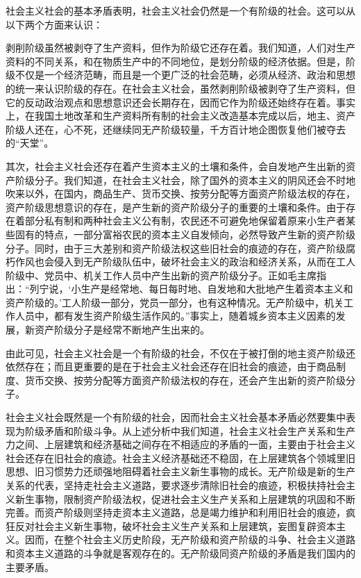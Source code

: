 \documentclass{book}
\begin{document}
社会主义社会的基本矛盾表明，社会主义社会仍然是一个有阶级的社会。这可以从以下两个方面来认识：

剥削阶级虽然被剥夺了生产资料，但作为阶级它还存在着。我们知道，人们对生产资料的不同关系，和在物质生产中的不同地位，是划分阶级的经济依据。但是，阶级不仅是一个经济范畴，而且是一个更广泛的社会范畴，必须从经济、政治和思想的统一来认识阶级的存在。在社会主义社会，虽然剥削阶级被剥夺了生产资料，但它的反动政治观点和思想意识还会长期存在，因而它作为阶级还始终存在着。事实上，在我国土地改革和生产资料所有制的社会主义改造基本完成以后，地主、资产阶级人还在，心不死，还继续同无产阶级较量，千方百计地企图恢复他们被夺去的“天堂”。

其次，社会主义社会还存在着产生资本主义的土壤和条件，会自发地产生出新的资产阶级分子。我们知道，在社会主义社会，除了国外的资本主义的阴风还会不时地吹来以外，在国内，商品生产、货币交换、按劳分配等方面资产阶级法权的存在，资产阶级思想意识的存在，是产生新的资产阶级分子的重要的土壤和条件。由于存在着部分私有制和两种社会主义公有制，农民还不可避免地保留着原来小生产者某些固有的特点，一部分富裕农民的资本主义自发倾向，必然导致产生新的资产阶级分子。同时，由于三大差别和资产阶级法权这些旧社会的痕迹的存在，资产阶级腐朽作风也会侵入到无产阶级队伍中，破坏社会主义的政治和经济关系，从而在工人阶级中、党员中、机关工作人员中产生出新的资产阶级分子。正如毛主席指出：“列宁说，‘小生产是经常地、每日每时地、自发地和大批地产生着资本主义和资产阶级的。’工人阶级一部分，党员一部分，也有这种情况。无产阶级中，机关工作人员中，都有发生资产阶级生活作风的。”事实上，随着城乡资本主义因素的发展，新资产阶级分子是经常不断地产生出来的。

由此可见，社会主义社会是一个有阶级的社会，不仅在于被打倒的地主资产阶级还依然存在；而且更重要的是在于社会主义社会还存在旧社会的痕迹，由于商品制度、货币交换、按劳分配等方面资产阶级法权的存在，还会产生出新的资产阶级分子。

社会主义社会既然是一个有阶级的社会，因而社会主义社会基本矛盾必然要集中表现为阶级矛盾和阶级斗争。从上述分析中我们知道，社会主义社会生产关系和生产力之间、上层建筑和经济基础之间存在不相适应的矛盾的一面，主要由于社会主义社会还存在旧社会的痕迹。社会主义经济基础还不稳固，在上层建筑各个领城里旧思想、旧习惯势力还顽强地阻碍着社会主义新生事物的成长。无产阶级是新的生产关系的代表，坚持走社会主义道路，要求逐步清除旧社会的痕迹，积极扶持社会主义新生事物，限制资产阶级法权，促进社会主义生产关系和上层建筑的巩固和不断完善。而资产阶级则坚持走资本主义道路，总是竭力维护和利用旧社会的痕迹，疯狂反对社会主义新生事物，破坏社会主义生产关系和上层建筑，妄图复辟资本主义。因而，在整个社会主义历史阶段，无产阶级和资产阶级的斗争、社会主义道路和资本主义道路的斗争就是客观存在的。无产阶级同资产阶级的矛盾是我们国内的主要矛盾。
\end{document}
